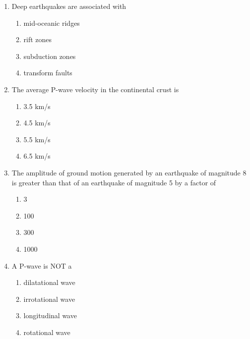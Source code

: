 \documentclass[journal,12pt,onecolumn]{IEEEtran}
\theoremstyle{remark}
\begin{document}
\begin{enumerate}[resume]
\item Deep earthquakes are associated with
\begin{multicols}{2}
\begin{enumerate}
\item mid-oceanic ridges
\item rift zones
\item subduction zones
\item transform faults
\end{enumerate}
\end{multicols}
\vspace{0.5cm}

\item The average P-wave velocity in the continental crust is
\begin{multicols}{4}
\begin{enumerate}
\item 3.5 km/s
\item 4.5 km/s
\item 5.5 km/s
\item 6.5 km/s
\end{enumerate}
\end{multicols}
\vspace{0.5cm}

\item The amplitude of ground motion generated by an earthquake of magnitude 8 is greater than that of an earthquake of magnitude 5 by a factor of
\begin{multicols}{4}
\begin{enumerate}
\item 3
\item 100
\item 300
\item 1000
\end{enumerate}
\end{multicols}
\vspace{0.5cm}

\item A P-wave is NOT a
\begin{multicols}{2}
\begin{enumerate}
\item dilatational wave
\item irrotational wave
\item longitudinal wave
\item rotational wave
\end{enumerate}
\end{multicols}
\vspace{0.5cm}


\end{enumerate}
\end{document}
